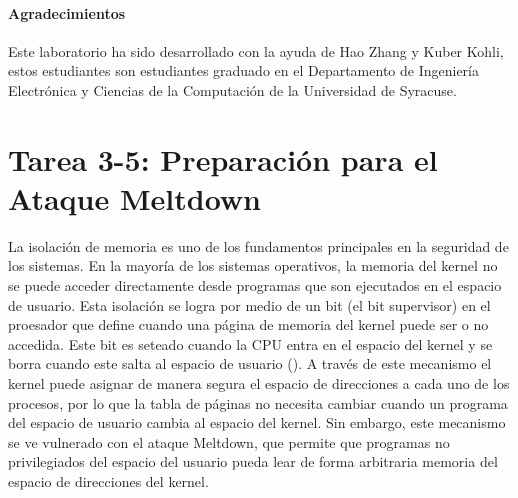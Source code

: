 \paragraph{Agradecimientos} Este laboratorio ha sido desarrollado con la ayuda de 
Hao Zhang y Kuber Kohli, estos estudiantes son estudiantes graduado en el Departamento de Ingeniería Electrónica y Ciencias de la Computación de la Universidad de Syracuse.




\newcommand{\sideChannelFigs}{./Figs}





\section{Tarea 3-5: Preparación para el Ataque Meltdown}

La isolación de memoria es uno de los fundamentos principales en la seguridad de los sistemas. En la mayoría de los sistemas operativos, la memoria del kernel no se puede acceder directamente desde programas que son ejecutados en el espacio de usuario. Esta isolación se logra por medio de un bit (el bit supervisor) en el proesador que define cuando una página de memoria del kernel puede ser o no accedida. Este bit es seteado cuando la CPU entra en el espacio del kernel y se borra cuando este salta al espacio de usuario (\cite{wiki:protectionring}).
A través de este mecanismo el kernel puede asignar de manera segura el espacio de direcciones a cada uno de los procesos, por lo que la tabla de páginas no necesita cambiar cuando un programa del espacio de usuario cambia al espacio del kernel.
Sin embargo, este mecanismo se ve vulnerado con el ataque Meltdown, que permite que programas no privilegiados del espacio del usuario pueda lear de forma arbitraria memoria del espacio de direcciones del kernel.

